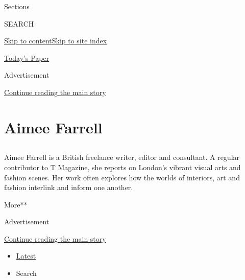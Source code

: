Sections

SEARCH

\protect\hyperlink{site-content}{Skip to
content}\protect\hyperlink{site-index}{Skip to site index}

\href{https://myaccount.nytimes3xbfgragh.onion/auth/login?response_type=cookie\&client_id=vi}{}

\href{https://www.nytimes3xbfgragh.onion/section/todayspaper}{Today's
Paper}

Advertisement

\protect\hyperlink{after-top}{Continue reading the main story}

\hypertarget{aimee-farrell}{%
\section{Aimee Farrell}\label{aimee-farrell}}

\subsection{}

Aimee Farrell is a British freelance writer, editor and consultant. A
regular contributor to T Magazine, she reports on London's vibrant
visual arts and fashion scenes. Her work often explores how the worlds
of interiors, art and fashion interlink and inform one another.

More**

Advertisement

\protect\hyperlink{after-mid1}{Continue reading the main story}

\begin{itemize}
\tightlist
\item
  \protect\hyperlink{stream-panel}{Latest}
\item
  Search
\end{itemize}

